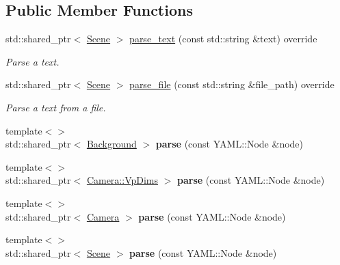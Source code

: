 \subsection*{Public Member Functions}
\begin{DoxyCompactItemize}
\item 
std\+::shared\+\_\+ptr$<$ \mbox{\hyperlink{classomg_1_1_scene}{Scene}} $>$ \mbox{\hyperlink{classomg_1_1_y_a_m_l_parser_a646b059fb458cbd5b9bc3a29c1f777f4}{parse\+\_\+text}} (const std\+::string \&text) override
\begin{DoxyCompactList}\small\item\em Parse a text. \end{DoxyCompactList}\item 
std\+::shared\+\_\+ptr$<$ \mbox{\hyperlink{classomg_1_1_scene}{Scene}} $>$ \mbox{\hyperlink{classomg_1_1_y_a_m_l_parser_ab569d1029cec7dc2cb91eb0e08f5bc37}{parse\+\_\+file}} (const std\+::string \&file\+\_\+path) override
\begin{DoxyCompactList}\small\item\em Parse a text from a file. \end{DoxyCompactList}\item 
\mbox{\label{classomg_1_1_y_a_m_l_parser_ad0148bff25d36e0f0a46ab52647e5ef7}} 
{\footnotesize template$<$$>$ }\\std\+::shared\+\_\+ptr$<$ \mbox{\hyperlink{classomg_1_1_background}{Background}} $>$ {\bfseries parse} (const Y\+A\+M\+L\+::\+Node \&node)
\item 
\mbox{\label{classomg_1_1_y_a_m_l_parser_aa7a71ee4f00286dc22e14258b215bfc4}} 
{\footnotesize template$<$$>$ }\\std\+::shared\+\_\+ptr$<$ \mbox{\hyperlink{structomg_1_1_camera_1_1_vp_dims}{Camera\+::\+Vp\+Dims}} $>$ {\bfseries parse} (const Y\+A\+M\+L\+::\+Node \&node)
\item 
\mbox{\label{classomg_1_1_y_a_m_l_parser_aae786077463e555fc165bf237cd71835}} 
{\footnotesize template$<$$>$ }\\std\+::shared\+\_\+ptr$<$ \mbox{\hyperlink{classomg_1_1_camera}{Camera}} $>$ {\bfseries parse} (const Y\+A\+M\+L\+::\+Node \&node)
\item 
\mbox{\label{classomg_1_1_y_a_m_l_parser_a164befb2f6725d60dd2d127651497ec9}} 
{\footnotesize template$<$$>$ }\\std\+::shared\+\_\+ptr$<$ \mbox{\hyperlink{classomg_1_1_scene}{Scene}} $>$ {\bfseries parse} (const Y\+A\+M\+L\+::\+Node \&node)
\end{DoxyCompactItemize}



